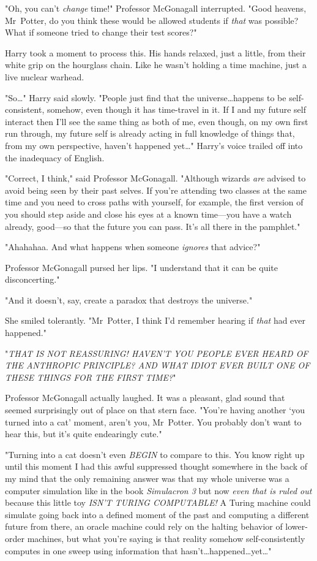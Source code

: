 "Oh, you can't \emph{change} time!" Professor McGonagall interrupted. "Good
heavens, Mr~Potter, do you think these would be allowed students if
\emph{that} was possible? What if someone tried to change their test scores?"

Harry took a moment to process this. His hands relaxed, just a little, from
their white grip on the hourglass chain. Like he wasn't holding a time machine,
just a live nuclear warhead.

"So…" Harry said slowly. "People just find that the universe…happens
to be self-consistent, somehow, even though it has time-travel in it.
If I and my future self interact then I'll see the same thing as both of me,
even though, on my own first run through, my future self is already acting in
full knowledge of things that, from my own perspective, haven't happened
yet…" Harry's voice trailed off into the inadequacy of English.

"Correct, I think," said Professor McGonagall. "Although wizards \emph{are}
advised to avoid being seen by their past selves. If you're attending two
classes at the same time and you need to cross paths with yourself, for
example, the first version of you should step aside and close his eyes at a
known time---you have a watch already, good---so that the future you can pass.
It's all there in the pamphlet."

"Ahahahaa. And what happens when someone \emph{ignores} that advice?"

Professor McGonagall pursed her lips. "I understand that it can be quite
disconcerting."

"And it doesn't, say, create a paradox that destroys the universe."

She smiled tolerantly. "Mr~Potter, I think I'd remember hearing if \emph{that}
had ever happened."

"\emph{THAT IS NOT REASSURING! HAVEN'T YOU PEOPLE EVER HEARD OF THE ANTHROPIC
PRINCIPLE? AND WHAT IDIOT EVER BUILT ONE OF THESE THINGS FOR THE FIRST TIME?}"

Professor McGonagall actually laughed. It was a pleasant, glad sound that
seemed surprisingly out of place on that stern face. "You're having another
`you turned into a cat' moment, aren't you, Mr~Potter. You probably don't want
to hear this, but it's quite endearingly cute."

"Turning into a cat doesn't even \emph{BEGIN} to compare to this. You know
right up until this moment I had this awful suppressed thought somewhere in the
back of my mind that the only remaining answer was that my whole universe was a
computer simulation like in the book \emph{Simulacron 3} but now \emph{even
that is ruled out} because this little toy \emph{ISN'T TURING COMPUTABLE!} A
Turing machine could simulate going back into a defined moment of the past and
computing a different future from there, an oracle machine could rely on the
halting behavior of lower-order machines, but what you're saying is that
reality somehow self-consistently computes in one sweep using information that
hasn't…happened…yet…"

